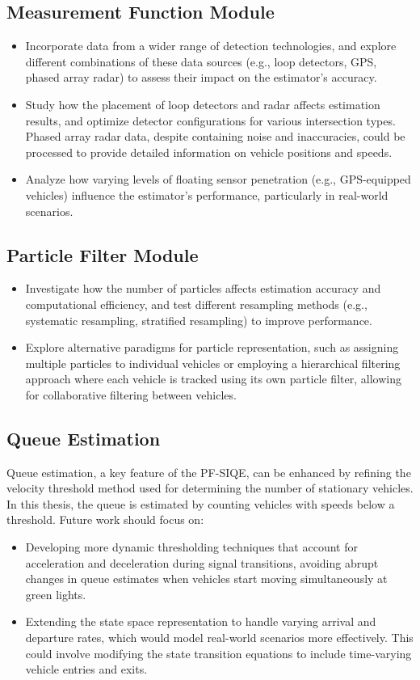 \subsection{Measurement Function Module}
    \begin{itemize}
        \item Incorporate data from a wider range of detection technologies, and explore different combinations of these data sources (e.g., loop detectors, GPS, phased array radar) to assess their impact on the estimator’s accuracy. 
        \item Study how the placement of loop detectors and radar affects estimation results, and optimize detector configurations for various intersection types. Phased array radar data, despite containing noise and inaccuracies, could be processed to provide detailed information on vehicle positions and speeds.
        \item Analyze how varying levels of floating sensor penetration (e.g., GPS-equipped vehicles) influence the estimator’s performance, particularly in real-world scenarios.
    \end{itemize}

\subsection{Particle Filter Module}
    \begin{itemize}
        \item Investigate how the number of particles affects estimation accuracy and computational efficiency, and test different resampling methods (e.g., systematic resampling, stratified resampling) to improve performance. 
        \item Explore alternative paradigms for particle representation, such as assigning multiple particles to individual vehicles or employing a hierarchical filtering approach where each vehicle is tracked using its own particle filter, allowing for collaborative filtering between vehicles.
    \end{itemize}

\subsection{Queue Estimation}
    Queue estimation, a key feature of the PF-SIQE, can be enhanced by refining the velocity threshold method used for determining the number of stationary vehicles. In this thesis, the queue is estimated by counting vehicles with speeds below a threshold. Future work should focus on:
    \begin{itemize}
        \item Developing more dynamic thresholding techniques that account for acceleration and deceleration during signal transitions, avoiding abrupt changes in queue estimates when vehicles start moving simultaneously at green lights.
        \item Extending the state space representation to handle varying arrival and departure rates, which would model real-world scenarios more effectively. This could involve modifying the state transition equations to include time-varying vehicle entries and exits.
    \end{itemize}

